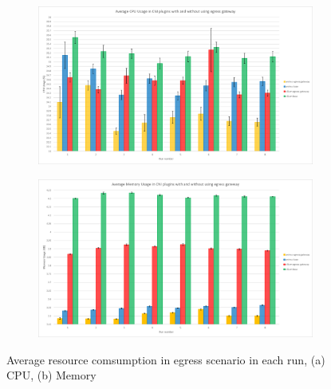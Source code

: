 \begin{figure}[H]
    \centering
    \begin{subfigure}[b]{0.55\textwidth}
        \includegraphics[width=\textwidth]{plots/egress/cpu_all.png}
        \caption{}
        \label{fig:cpu_all}
    \end{subfigure}
    \begin{subfigure}[b]{0.55\textwidth}
        \includegraphics[width=\textwidth]{plots/egress/memory_all.png}
        \caption{}
        \label{fig:memory_all}
    \end{subfigure}
    
    \caption{Average resource comsumption in egress scenario in each run, (a) CPU, (b) Memory}
    \label{fig:res_all}
\end{figure}



